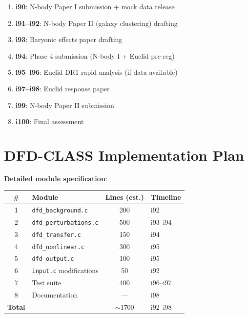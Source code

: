 \documentclass[11pt,a4paper]{article}
\begin{document}
\begin{tcolorbox}[colback=blue!5!white, colframe=dfdblue, title=\textbf{N-body Exploitation Plan (i90--i100)}]
\begin{enumerate}[nosep]
\item \textbf{i90}: N-body Paper I submission + mock data release
\item \textbf{i91--i92}: N-body Paper II (galaxy clustering) drafting
\item \textbf{i93}: Baryonic effects paper drafting
\item \textbf{i94}: Phase 4 submission (N-body I + Euclid pre-reg)
\item \textbf{i95--i96}: Euclid DR1 rapid analysis (if data available)
\item \textbf{i97--i98}: Euclid response paper
\item \textbf{i99}: N-body Paper II submission
\item \textbf{i100}: Final assessment
\end{enumerate}
\end{tcolorbox}

\section{DFD-CLASS Implementation Plan}

\textbf{Detailed module specification}:

\begin{center}
\begin{tabular}{clcl}
\toprule
\textbf{\#} & \textbf{Module} & \textbf{Lines (est.)} & \textbf{Timeline} \\
\midrule
1 & \texttt{dfd\_background.c} & 200 & i92 \\
2 & \texttt{dfd\_perturbations.c} & 500 & i93--i94 \\
3 & \texttt{dfd\_transfer.c} & 150 & i94 \\
4 & \texttt{dfd\_nonlinear.c} & 300 & i95 \\
5 & \texttt{dfd\_output.c} & 100 & i95 \\
6 & \texttt{input.c} modifications & 50 & i92 \\
7 & Test suite & 400 & i96--i97 \\
8 & Documentation & --- & i98 \\
\midrule
\textbf{Total} & & $\sim 1700$ & i92--i98 \\
\bottomrule
\end{tabular}
\end{center}
\end{document}
